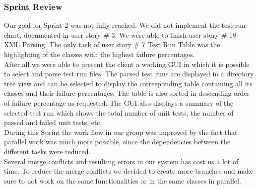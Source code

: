 \subsubsection*{Sprint Review}

Our goal for Sprint 2 was not fully reached. We did not implement the test run chart, documented in user story \# 3. We were able to finish user story \# 18 XML Parsing. The only task of user story \# 7 Test Run Table was the highlighting of the classes with the highest failure percentages. \\ 

After all we were able to present the client a working GUI in which it is possible to select and parse test run files. The parsed test runs are displayed in a directory tree view and can be selected to display the corresponding table containing all its classes and their failure percentages. The table is also sorted in descending order of failure percentage as requested. The GUI also displays a summary of the selected test run which shows the total number of unit tests, the number of passed and failed unit tests, etc. \\ 

During this Sprint the work flow in our group was improved by the fact that parallel work was much more possible, since the dependencies between the different tasks were reduced. \\ 

Several merge conflicts and resulting errors in our system has cost us a lot of time. To reduce the merge conflicts we decided to create more branches and make sure to not work on the same functionalities or in the same classes in parallel. \\ 

